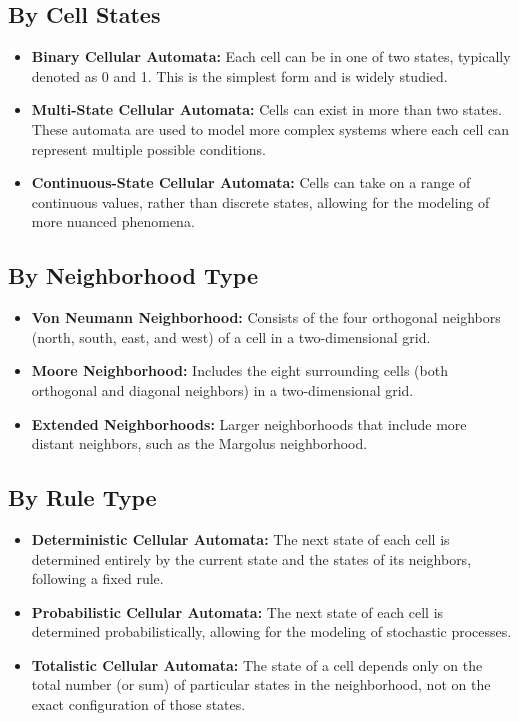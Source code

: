 \documentclass[9pt,a4paper,twoside]{tau-class/tau}
\begin{document}
\subsection{By Cell States}

\begin{itemize}
    \item \textbf{Binary Cellular Automata:} Each cell can be in one of two states, typically denoted as 0 and 1. This is the simplest form and is widely studied.
    \item \textbf{Multi-State Cellular Automata:} Cells can exist in more than two states. These automata are used to model more complex systems where each cell can represent multiple possible conditions.
    \item \textbf{Continuous-State Cellular Automata:} Cells can take on a range of continuous values, rather than discrete states, allowing for the modeling of more nuanced phenomena.
\end{itemize}

\subsection{By Neighborhood Type}

\begin{itemize}
    \item \textbf{Von Neumann Neighborhood:} Consists of the four orthogonal neighbors (north, south, east, and west) of a cell in a two-dimensional grid.
    \item \textbf{Moore Neighborhood:} Includes the eight surrounding cells (both orthogonal and diagonal neighbors) in a two-dimensional grid.
    \item \textbf{Extended Neighborhoods:} Larger neighborhoods that include more distant neighbors, such as the Margolus neighborhood.
\end{itemize}

\subsection{By Rule Type}

\begin{itemize}
    \item \textbf{Deterministic Cellular Automata:} The next state of each cell is determined entirely by the current state and the states of its neighbors, following a fixed rule.
    \item \textbf{Probabilistic Cellular Automata:} The next state of each cell is determined probabilistically, allowing for the modeling of stochastic processes.
    \item \textbf{Totalistic Cellular Automata:} The state of a cell depends only on the total number (or sum) of particular states in the neighborhood, not on the exact configuration of those states.
\end{itemize}
\end{document}
